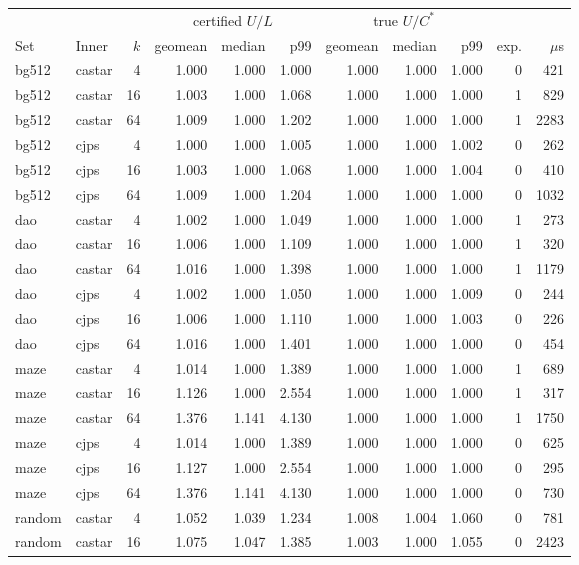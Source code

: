 \begin{tabular}{llr rrr rrr rr}\toprule
 & & & \multicolumn{3}{c}{certified $U/L$} & \multicolumn{3}{c}{true $U/C^*$} & & \\
Set & Inner & $k$ & geomean & median & p99 & geomean & median & p99 & exp. & $\mu$s\\\midrule
bg512 & castar & 4 & 1.000 & 1.000 & 1.000 & 1.000 & 1.000 & 1.000 & 0 & 421\\
bg512 & castar & 16 & 1.003 & 1.000 & 1.068 & 1.000 & 1.000 & 1.000 & 1 & 829\\
bg512 & castar & 64 & 1.009 & 1.000 & 1.202 & 1.000 & 1.000 & 1.000 & 1 & 2283\\
bg512 & cjps & 4 & 1.000 & 1.000 & 1.005 & 1.000 & 1.000 & 1.002 & 0 & 262\\
bg512 & cjps & 16 & 1.003 & 1.000 & 1.068 & 1.000 & 1.000 & 1.004 & 0 & 410\\
bg512 & cjps & 64 & 1.009 & 1.000 & 1.204 & 1.000 & 1.000 & 1.000 & 0 & 1032\\
dao & castar & 4 & 1.002 & 1.000 & 1.049 & 1.000 & 1.000 & 1.000 & 1 & 273\\
dao & castar & 16 & 1.006 & 1.000 & 1.109 & 1.000 & 1.000 & 1.000 & 1 & 320\\
dao & castar & 64 & 1.016 & 1.000 & 1.398 & 1.000 & 1.000 & 1.000 & 1 & 1179\\
dao & cjps & 4 & 1.002 & 1.000 & 1.050 & 1.000 & 1.000 & 1.009 & 0 & 244\\
dao & cjps & 16 & 1.006 & 1.000 & 1.110 & 1.000 & 1.000 & 1.003 & 0 & 226\\
dao & cjps & 64 & 1.016 & 1.000 & 1.401 & 1.000 & 1.000 & 1.000 & 0 & 454\\
maze & castar & 4 & 1.014 & 1.000 & 1.389 & 1.000 & 1.000 & 1.000 & 1 & 689\\
maze & castar & 16 & 1.126 & 1.000 & 2.554 & 1.000 & 1.000 & 1.000 & 1 & 317\\
maze & castar & 64 & 1.376 & 1.141 & 4.130 & 1.000 & 1.000 & 1.000 & 1 & 1750\\
maze & cjps & 4 & 1.014 & 1.000 & 1.389 & 1.000 & 1.000 & 1.000 & 0 & 625\\
maze & cjps & 16 & 1.127 & 1.000 & 2.554 & 1.000 & 1.000 & 1.000 & 0 & 295\\
maze & cjps & 64 & 1.376 & 1.141 & 4.130 & 1.000 & 1.000 & 1.000 & 0 & 730\\
random & castar & 4 & 1.052 & 1.039 & 1.234 & 1.008 & 1.004 & 1.060 & 0 & 781\\
random & castar & 16 & 1.075 & 1.047 & 1.385 & 1.003 & 1.000 & 1.055 & 0 & 2423\\

\end{tabular}
